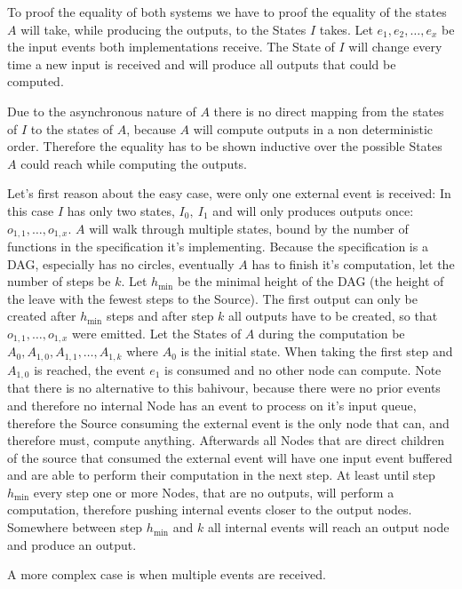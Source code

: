 To proof the equality of both systems we have to proof the equality of the states \(A\) will take, while producing the
outputs, to the States \(I\) takes.
Let \(e_1, e_2, \dots, e_x\) be the input events both implementations receive.
The State of \(I\) will change every time a new input is received and will produce all outputs that could be computed.

Due to the asynchronous nature of \(A\) there is no direct mapping from the states of \(I\) to the states of \(A\), because
\(A\) will compute outputs in a non deterministic order.
Therefore the equality has to be shown inductive over the possible States \(A\) could reach while computing the outputs.

Let's first reason about the easy case, were only one external event is received:
In this case \(I\) has only two states, \(I_0,\ I_1\) and will only produces outputs once: \(o_{1,1}, \dots, o_{1,x}\).
\(A\) will walk through multiple states, bound by the number of functions in the specification it's implementing.
Because the specification is a DAG, especially has no circles, eventually \(A\) has to finish it's computation, let the
number of steps be \(k\).
Let \(h_{\min}\) be the minimal height of the DAG (the height of the leave with the fewest steps to the Source).
The first output can only be created after \(h_{\min}\) steps and after step \(k\) all outputs have to be created, so that
\(o_{1,1}, \dots, o_{1,x}\) were emitted.
Let the States of \(A\) during the computation be \(A_{0}, A_{1,0}, A_{1,1}, \dots, A_{1,k}\) where \(A_0\) is the initial state.
When taking the first step and \(A_{1,0}\) is reached, the event \(e_1\) is consumed and no other node can compute.
Note that there is no alternative to this bahivour, because there were no prior events and therefore no internal Node
has an event to process on it's input queue, therefore the Source consuming the external event is the only node that can,
and therefore must, compute anything.
Afterwards all Nodes that are direct children of the source that consumed the external event will have one input event buffered and
are able to perform their computation in the next step.
At least until step \(h_{\min}\) every step one or more Nodes, that are no outputs, will perform a computation, therefore
pushing internal events closer to the output nodes.
Somewhere between step \(h_{\min}\) and \(k\) all internal events will reach an output node and produce an output.

A more complex case is when multiple events are received.


